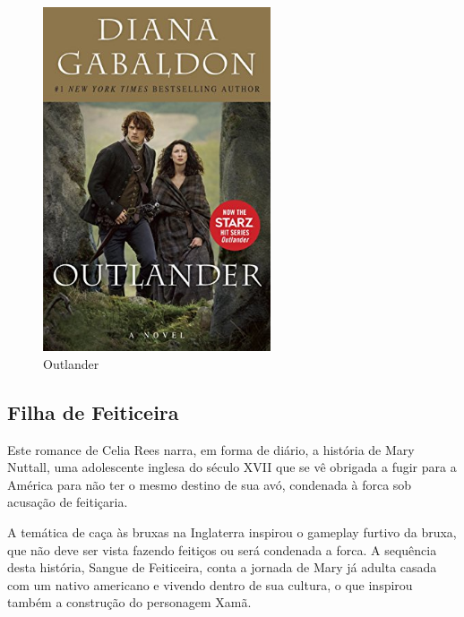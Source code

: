 \begin{figure}[!htb] \caption{\label{Outlander}Outlander} \begin{center}
\includegraphics[width=0.6\textwidth]{imagens/outlander.jpg} \end{center}
 \end{figure}

\clearpage

\subsection{Filha de Feiticeira}

Este romance de Celia Rees narra, em forma de diário, a história de Mary Nuttall, uma adolescente inglesa do século XVII que se vê obrigada a fugir para a América para não ter o mesmo destino de sua avó, condenada à forca sob acusação de feitiçaria.

A temática de caça às bruxas na Inglaterra inspirou o gameplay furtivo da bruxa, que não deve ser vista fazendo feitiços ou será condenada a forca.
A sequência desta história, Sangue de Feiticeira, conta a jornada de Mary já adulta casada com um nativo americano e vivendo dentro de sua cultura, o que inspirou também a construção do personagem Xamã.

